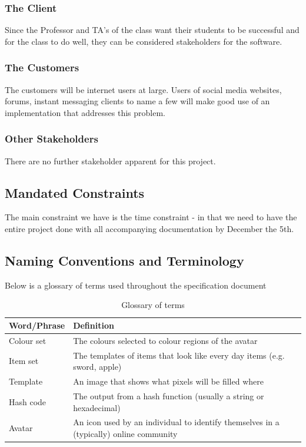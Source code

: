\documentclass[12pt, titlepage]{article}
\begin{document}
\subsubsection{The Client}
Since the Professor and TA's of the class want their students to be successful and for the class to do well, they can be considered stakeholders for the software.

\subsubsection{The Customers}
The customers will be internet users at large. Users of social media websites, forums, instant messaging clients to name a few will make good use of an implementation that addresses this problem.

\subsubsection{Other Stakeholders}
There are no further stakeholder apparent for this project.

\subsection{Mandated Constraints}
The main constraint we have is the time constraint - in that we need to have the entire project done with all accompanying documentation by December the 5th.

\subsection{Naming Conventions and Terminology}
Below is a glossary of terms used throughout the specification document
\begin{table}[h!]
\caption{Glossary of terms}
\label{t}
\begin{tabular}{|l|p{10cm}|}
\hline
Word/Phrase & Definition                                                                             \\ \hline
Colour set  & The colours selected to colour regions of the avatar                                   \\ \hline
Item set    & The templates of items that look like every day items (e.g. sword, apple)              \\ \hline
Template    & An image that shows what pixels will be filled where                                   \\ \hline
Hash code   & The output from a hash function (usually a string or hexadecimal)                      \\ \hline
Avatar      & An icon used by an individual to identify themselves in a (typically) online community \\ \hline
\end{tabular}
\end{table}
\end{document}
